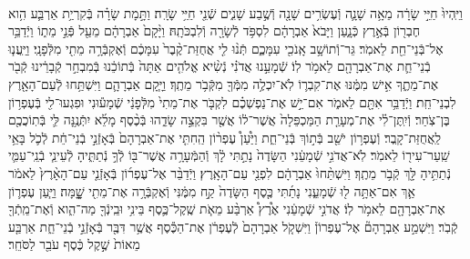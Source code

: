 \documentclass[twoside, openany, parskip=half, 11pt]{book}
\begin{document}
\begin{footnotesize}
\begin{multicols}{2}
\\
וַיִּֽהְיוּ֙ חַיֵּ֣י שָׂרָ֔ה מֵאָ֥ה שָׁנָ֛ה וְֿעֶשְׂרִ֥ים שָׁנָ֖ה וְֿשֶׁ֣בַע שָׁנִ֑ים שְֿׁנֵ֖י חַיֵּ֥י שָׂרָֽה׃ וַתָּ֣מָת שָׂרָ֗ה בְּֿקִרְיַ֥ת אַרְבַּ֛ע הִ֥וא חֶבְר֖וֹן בְּֿאֶ֣רֶץ כְּֿנָ֑עַן וַיָּבֹא֙ אַבְרָהָ֔ם לִסְפֹּ֥ד לְֿשָׂרָ֖ה וְֿלִבְכֹּתָֽהּ׃ וַיָּ֨קָם֙ אַבְרָהָ֔ם מֵעַ֖ל פְּֿנֵ֣י מֵת֑וֹ וַיְֿדַבֵּ֥ר אֶל־בְּֿנֵי־חֵ֖ת לֵאמֹֽר׃ גֵּר־וְֿתוֹשָׁ֥ב אָֽנֹכִ֖י עִמָּכֶ֑ם תְּֿנ֨וּ לִ֤י אֲחֻזַּת־קֶ֨בֶר֙ עִמָּכֶ֔ם וְֿאֶקְבְּֿרָ֥ה מֵתִ֖י מִלְּֿפָנָֽי׃ וַיַּֽעֲנ֧וּ בְֿנֵי־חֵ֛ת אֶת־אַבְרָהָ֖ם לֵאמֹ֥ר לֽוֹ׃ שְֿׁמָעֵ֣נוּ אֲדֹנִ֗י נְֿשִׂ֨יא אֱלֹהִ֤ים אַתָּה֙ בְּֿתוֹכֵ֔נוּ בְּֿמִבְחַ֣ר קְֿבָרֵ֔ינוּ קְֿבֹ֖ר אֶת־מֵתֶ֑ךָ אִ֣ישׁ מִמֶּ֔נּוּ אֶת־קִבְר֛וֹ לֹֽא־יִכְלֶ֥ה מִמְּֿךָ֖ מִקְּֿבֹ֥ר מֵתֶֽךָ׃ וַיָּ֧קָם אַבְרָהָ֛ם וַיִּשְׁתַּ֥חוּ לְֿעַם־הָאָ֖רֶץ לִבְנֵי־חֵֽת׃  וַיְֿדַבֵּ֥ר אִתָּ֖ם לֵאמֹ֑ר אִם־יֵ֣שׁ אֶת־נַפְשְׁכֶ֗ם לִקְבֹּ֤ר אֶת־מֵתִי֙ מִלְּֿפָנַ֔י שְֿׁמָע֕וּנִי וּפִגְעוּ־לִ֖י בְּֿעֶפְר֥וֹן בֶּן־צֹֽחַר׃ וְֿיִֽתֶּן־לִ֗י אֶת־מְעָרַ֤ת הַמַּכְפֵּלָה֙ אֲשֶׁר־ל֔וֹ אֲשֶׁ֖ר בִּקְצֵ֣ה שָׂדֵ֑הוּ בְּֿכֶ֨סֶף מָלֵ֜א יִתְּֿנֶ֥נָּה לִּ֛י בְּֿתֽוֹכֲכֶ֖ם לַֽאֲחֻזַּת־קָֽבֶר׃ וְֿעֶפְר֥וֹן יֹשֵׁ֖ב בְּֿת֣וֹךְ בְּֿנֵי־חֵ֑ת וַיַּ֩עַן֩ עֶפְר֨וֹן הַֽחִתִּ֤י אֶת־אַבְרָהָם֙ בְּֿאָזְֿנֵ֣י בְֿנֵי־חֵ֔ת לְֿכֹ֛ל בָּאֵ֥י שַֽׁעַר־עִיר֖וֹ לֵאמֹֽר׃ לֹֽא־אֲדֹנִ֣י שְֿׁמָעֵ֔נִי הַשָּׂדֶה֙ נָתַ֣תִּי לָ֔ךְ וְֿהַמְּֿעָרָ֥ה אֲשֶׁר־בּ֖וֹ לְֿךָ֣ נְֿתַתִּ֑יהָ לְֿעֵינֵ֧י בְֿנֵֽי־עַמִּ֛י נְֿתַתִּ֥יהָ לָּ֖ךְ קְֿבֹ֥ר מֵתֶֽךָ׃ וַיִּשְׁתַּ֨חוּ֙ אַבְרָהָ֔ם לִפְנֵ֖י עַם־הָאָֽרֶץ׃  וַיְֿדַבֵּ֨ר אֶל־עֶפְר֜וֹן בְּֿאָזְֿנֵ֤י עַם־הָאָ֨רֶץ֙ לֵאמֹ֔ר אַ֛ךְ אִם־אַתָּ֥ה ל֖וּ שְֿׁמָעֵ֑נִי נָתַ֜תִּי כֶּ֤סֶף הַשָּׂדֶה֙ קַ֣ח מִמֶּ֔נִּי וְֿאֶקְבְּֿרָ֥ה אֶת־מֵתִ֖י שׇׇׇׇָֽׁמָּה׃ וַיַּ֧עַן עֶפְר֛וֹן אֶת־אַבְרָהָ֖ם לֵאמֹ֥ר לֽוֹ׃ אֲדֹנִ֣י שְֿׁמָעֵ֔נִי אֶ֩רֶץ֩ אַרְבַּ֨ע מֵאֹ֧ת שֶֽׁקֶל־כֶּ֛סֶף בֵּינִ֥י וּבֵֽינְֿךָ֖ מַה־הִ֑וא וְֿאֶת־מֵֽתְֿךָ֖ קְֿבֹֽר׃ וַיִּשְׁמַ֣ע אַבְרָהָם֘ אֶל־עֶפְרוֹן֒ וַיִּשְׁקֹ֤ל אַבְרָהָם֙ לְֿעֶפְרֹ֔ן אֶת־הַכֶּ֕סֶף אֲשֶׁ֥ר דִּבֶּ֖ר בְּֿאָזְֿנֵ֣י בְֿנֵי־חֵ֑ת אַרְבַּ֤ע מֵאוֹת֙ שֶׁ֣קֶל כֶּ֔סֶף עֹבֵ֖ר לַסֹּחֵֽר׃


\end{multicols}
\end{footnotesize}
\end{document}
